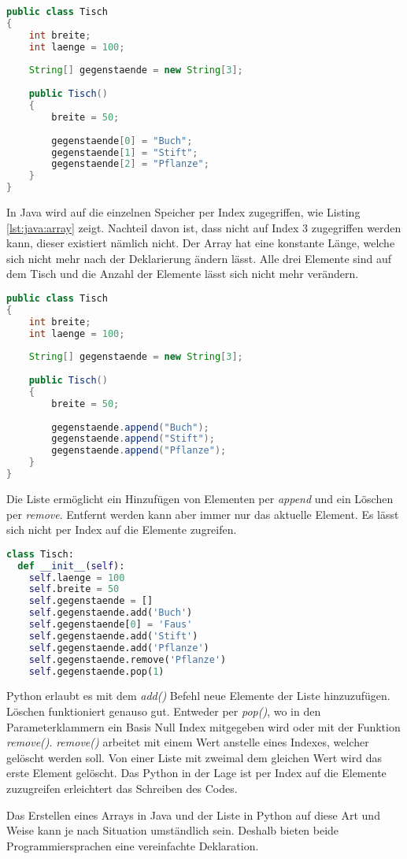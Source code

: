 \begin{lstlisting}[language=java,caption={Array in Java},captionpos=b,label={lst:java:array},frame=none]
public class Tisch
{
    int breite;
    int laenge = 100;
  
    String[] gegenstaende = new String[3];
  
    public Tisch()
    {
        breite = 50;
    
        gegenstaende[0] = "Buch";
        gegenstaende[1] = "Stift";
        gegenstaende[2] = "Pflanze";
    }
}
\end{lstlisting}

In Java wird auf die einzelnen Speicher per Index zugegriffen, wie Listing \ref{lst:java:array} zeigt. Nachteil davon ist, dass nicht auf Index 3 zugegriffen werden kann, dieser existiert nämlich nicht. Der Array hat eine konstante Länge, welche sich nicht mehr nach der Deklarierung ändern lässt. Alle drei Elemente sind auf dem Tisch und die Anzahl der Elemente lässt sich nicht mehr verändern.
\newpage
\begin{lstlisting}[language=java,caption={Liste in Java},captionpos=b,label={lst:java:liste},frame=none]
public class Tisch
{
    int breite;
    int laenge = 100;
  
    String[] gegenstaende = new String[3];
  
    public Tisch()
    {
        breite = 50;
    
        gegenstaende.append("Buch");
        gegenstaende.append("Stift");
        gegenstaende.append("Pflanze");
    }
}
\end{lstlisting}

Die Liste ermöglicht ein Hinzufügen von Elementen per \textit{append} und ein Löschen per \textit{remove}. Entfernt werden kann aber immer nur das aktuelle Element. Es lässt sich nicht per Index auf die Elemente zugreifen.

\begin{lstlisting}[language=python,caption={Liste in Python},captionpos=b,label={lst:python:liste},frame=none]
class Tisch:
  def __init__(self):
    self.laenge = 100
    self.breite = 50
    self.gegenstaende = []
    self.gegenstaende.add('Buch')
    self.gegenstaende[0] = 'Faus'
    self.gegenstaende.add('Stift')
    self.gegenstaende.add('Pflanze')
    self.gegenstaende.remove('Pflanze')
    self.gegenstaende.pop(1)
\end{lstlisting}

Python erlaubt es mit dem \textit{add()} Befehl neue Elemente der Liste hinzuzufügen. Löschen funktioniert genauso gut. Entweder per \textit{pop()}, wo in den Parameterklammern ein Basis Null Index mitgegeben wird oder mit der Funktion \textit{remove()}. \textit{remove()} arbeitet mit einem Wert anstelle eines Indexes, welcher gelöscht werden soll. Von einer Liste mit zweimal dem gleichen Wert wird das erste Element gelöscht. Das Python in der Lage ist per Index auf die Elemente zuzugreifen erleichtert das Schreiben des Codes.\par
Das Erstellen eines Arrays in Java und der Liste in Python auf diese Art und Weise kann je nach Situation umständlich sein. Deshalb bieten beide Programmiersprachen eine vereinfachte Deklaration.\newpage

